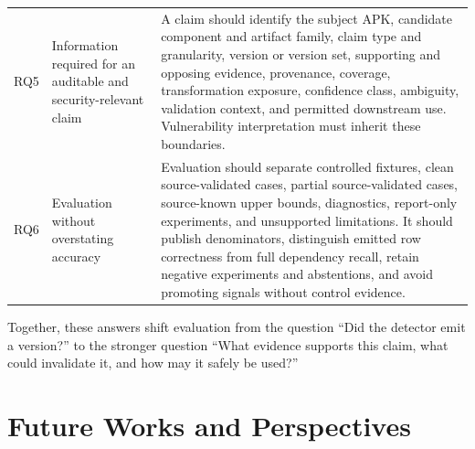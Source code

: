 \begin{longtable}{>{\raggedright\arraybackslash}p{}>{\raggedright\arraybackslash}p{}>{\raggedright\arraybackslash}p{}}
RQ5 & Information required for an auditable and security-relevant claim & A
claim should identify the subject APK, candidate component and artifact family,
claim type and granularity, version or version set, supporting and opposing
evidence, provenance, coverage, transformation exposure, confidence class,
ambiguity, validation context, and permitted downstream use. Vulnerability
interpretation must inherit these boundaries.\\

RQ6 & Evaluation without overstating accuracy & Evaluation should separate
controlled fixtures, clean source-validated cases, partial source-validated
cases, source-known upper bounds, diagnostics, report-only experiments, and
unsupported limitations. It should publish denominators, distinguish emitted
row correctness from full dependency recall, retain negative experiments and
abstentions, and avoid promoting signals without control evidence.\\
\bottomrule
\end{longtable}
\endgroup

Together, these answers shift evaluation from the question ``Did the detector
emit a version?'' to the stronger question ``What evidence supports this
claim, what could invalidate it, and how may it safely be used?''

\section{Future Works and Perspectives}

